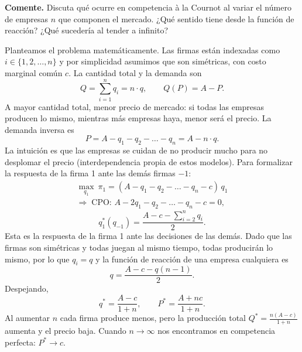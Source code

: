 \question \textbf{Comente.} Discuta qué ocurre en competencia à la Cournot al variar el número de empresas $n$ que componen el mercado. ¿Qué sentido tiene desde la función de reacción? ¿Qué sucedería al tender a infinito?
\begin{solution}
Planteamos el problema matemáticamente. Las firmas están indexadas como $i\in\{1,2,\dots,n\}$ y por simplicidad asumimos que son simétricas, con costo marginal común $c$. La cantidad total y la demanda son
\[
  Q = \sum_{i=1}^{n} q_i = n\cdot q, \qquad Q(P) = A - P .
\]
A mayor cantidad total, menor precio de mercado: si todas las empresas producen lo mismo, mientras más empresas haya, menor será el precio. La demanda inversa es
\[
  P = A - q_1 - q_2 - \dots - q_n = A - n\cdot q .
\]
La intuición es que las empresas se cuidan de no producir mucho para no desplomar el precio (interdependencia propia de estos modelos). Para formalizar la respuesta de la firma 1 ante las demás firmas $-1$:
\[
\begin{gathered}
  \max_{q_1}\ \pi_1 = (A - q_1 - q_2 - \dots - q_n - c)\,q_1 \\
  \Longrightarrow\; \text{CPO: } A - 2q_1 - q_2 - \dots - q_n - c = 0,
\end{gathered}
\]
\[
  q_1^*(q_{-1}) = \frac{A - c - \sum_{i=2}^{n} q_i}{2}.
\]
Esta es la respuesta de la firma 1 ante las decisiones de las demás. Dado que las firmas son simétricas y todas juegan al mismo tiempo, todas producirán lo mismo, por lo que $q_i=q$ y la función de reacción de una empresa cualquiera es
\[
  q = \frac{A - c - q(n-1)}{2}.
\]
Despejando,
\[
  q^* = \frac{A-c}{1+n}, \qquad P^* = \frac{A + nc}{1+n}.
\]
Al aumentar $n$ cada firma produce menos, pero la producción total $Q^* = \frac{n(A-c)}{1+n}$ aumenta y el precio baja. Cuando $n\to\infty$ nos encontramos en competencia perfecta: $P^* \to c$.

\end{solution}


